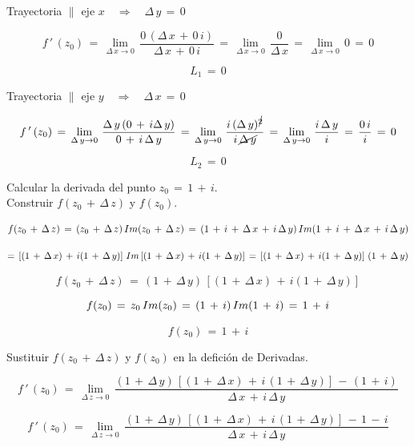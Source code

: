 \documentclass[a4paper,11pt,openany]{book}
\begin{document}
\textcolor{ao(english)}{} Trayectoria $\parallel$ eje $x \quad\Rightarrow\quad \Delta\,y\,=\,0$

$$f\,'\,(z_{0})\,=\,\displaystyle\lim_{\Delta\,x \to 0}\,\dfrac{0\,(\Delta\,x\,+\,0\,i)}{\Delta\,x\,+\,0\,i}\,=\,\displaystyle\lim_{\Delta\,x \to 0}\,\dfrac{0}{\Delta\,x}\,=\,\displaystyle\lim_{\Delta\,x \to 0}\,0\,=\,0$$

$$L_{1}\,=\,0$$

\textcolor{ao(english)}{} Trayectoria $\parallel$ eje $y \quad\Rightarrow\quad \Delta\,x\,=\,0$

$$f\,'\,(z_{0})\,=\,\displaystyle\lim_{\Delta\,y \to 0}\,\dfrac{\Delta\,y\,(0\,+\,i\Delta\,y)}{0\,+\,i\,\Delta\,y}\,=\,\displaystyle\lim_{\Delta\,y \to 0}\,\dfrac{i\,(\Delta\,y)^{\cancel{2}}}{i\,\cancel{\Delta\,y}}\,=\,\displaystyle\lim_{\Delta\,y \to 0}\,\dfrac{i\,\Delta\,y}{i}\,=\,\dfrac{0\,i}{i}\,=\,0$$

$$L_{2}\,=\,0$$

\textcolor{ao(english)}{} Calcular la derivada del punto $z_{0}\,=\,1\,+\,i$.\\

\textcolor{ao(english)}{} Construir $f(z_{0}\,+\,\Delta\,z)$ y $f(z_{0})$.

$$f(z_{0}\,+\,\Delta\,z)\,=\,(z_{0}\,+\,\Delta\,z)\,\mathnormal{Im}(z_{0}\,+\,\Delta\,z)\,=\,(1\,+\,i\,+\,\Delta\,x\,+\,i\,\Delta\,y)\,\mathnormal{Im}(1\,+\,i\,+\,\Delta\,x\,+\,i\,\Delta\,y)$$

$$=\,\left[(1\,+\,\Delta\,x)\,+\,i(1\,+\,\Delta\,y)\right]\,\mathnormal{Im}\left[(1\,+\,\Delta\,x)\,+\,i(1\,+\,\Delta\,y)\right]\,=\,\left[(1\,+\,\Delta\,x)\,+\,i(1\,+\,\Delta\,y)\right]\,(1\,+\,\Delta\,y)$$

$$f(z_{0}\,+\,\Delta\,z)\,=\,(1\,+\,\Delta\,y)\,\left[(1\,+\,\Delta\,x)\,+\,i(1\,+\,\Delta\,y)\right]$$

$$f(z_{0})\,=\,z_{0}\,\mathnormal{Im}(z_{0})\,=\,(1\,+\,i)\,\mathnormal{Im}(1\,+\,i)\,=\,1\,+\,i$$

$$f(z_{0})\,=\,1\,+\,i$$

\textcolor{ao(english)}{} Sustituir  $f(z_{0}\,+\,\Delta\,z)$ y $f(z_{0})$ en la defición de Derivadas.

$$f\,'\,(z_{0})\,=\,\displaystyle\lim_{\Delta\,z \to 0}\,\dfrac{(1\,+\,\Delta\,y)\,\left[(1\,+\,\Delta\,x)\,+\,i\,(1\,+\,\Delta\,y)\right]\,-\,(1\,+\,i)}{\Delta\,x\,+\,i\,\Delta\,y}$$

$$f\,'\,(z_{0})\,=\,\displaystyle\lim_{\Delta\,z \to 0}\,\dfrac{(1\,+\,\Delta\,y)\,\left[(1\,+\,\Delta\,x)\,+\,i\,(1\,+\,\Delta\,y)\right]\,-\,1\,-\,i}{\Delta\,x\,+\,i\,\Delta\,y}$$
\end{document}
